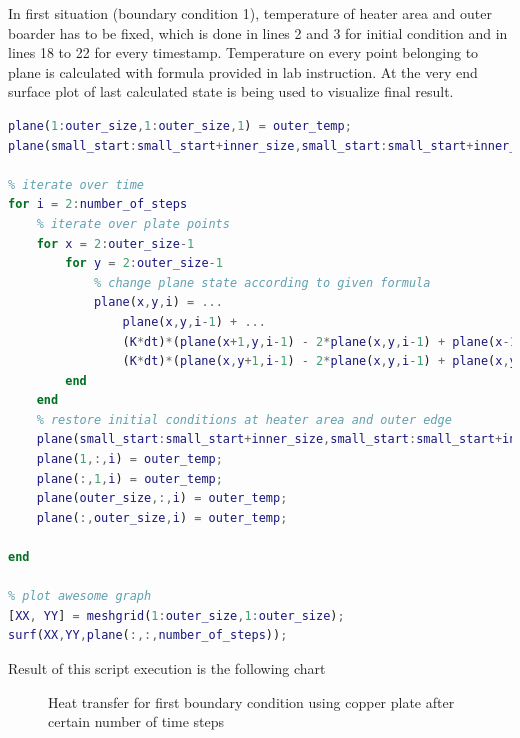 \documentclass[onecolumn]{article}
\begin{document}
In first situation (boundary condition 1), temperature of heater area and outer boarder has to be fixed, which is done in lines 2 and 3 for initial condition and in lines 18 to 22 for every timestamp. Temperature on every point belonging to plane is calculated with formula provided in lab instruction. At the very end surface plot of last calculated state is being used to visualize final result.

\begin{lstlisting}[language=Matlab,frame=single,label={lst:autocorr},breaklines=true,caption={matlab script implementing first boundary condition}]
% assign initial plate state
plane(1:outer_size,1:outer_size,1) = outer_temp;
plane(small_start:small_start+inner_size,small_start:small_start+inner_size, 1) = inner_temp;

% iterate over time
for i = 2:number_of_steps
    % iterate over plate points
    for x = 2:outer_size-1
        for y = 2:outer_size-1
            % change plane state according to given formula
            plane(x,y,i) = ...
                plane(x,y,i-1) + ...
                (K*dt)*(plane(x+1,y,i-1) - 2*plane(x,y,i-1) + plane(x-1,y,i-1))/(cw*ro*dx*dx) + ...
                (K*dt)*(plane(x,y+1,i-1) - 2*plane(x,y,i-1) + plane(x,y-1,i-1))/(cw*ro*dy*dy);
        end
    end
    % restore initial conditions at heater area and outer edge
    plane(small_start:small_start+inner_size,small_start:small_start+inner_size, i) = inner_temp;
    plane(1,:,i) = outer_temp;
    plane(:,1,i) = outer_temp;
    plane(outer_size,:,i) = outer_temp;
    plane(:,outer_size,i) = outer_temp;

end

% plot awesome graph
[XX, YY] = meshgrid(1:outer_size,1:outer_size);
surf(XX,YY,plane(:,:,number_of_steps));
\end{lstlisting}

Result of this script execution is the following chart
\begin{figure}[H]
\noindent{}
\caption{Heat transfer for first boundary condition using copper plate after certain number of time steps}
\label{fig:plate}
\end{figure}
\end{document}
